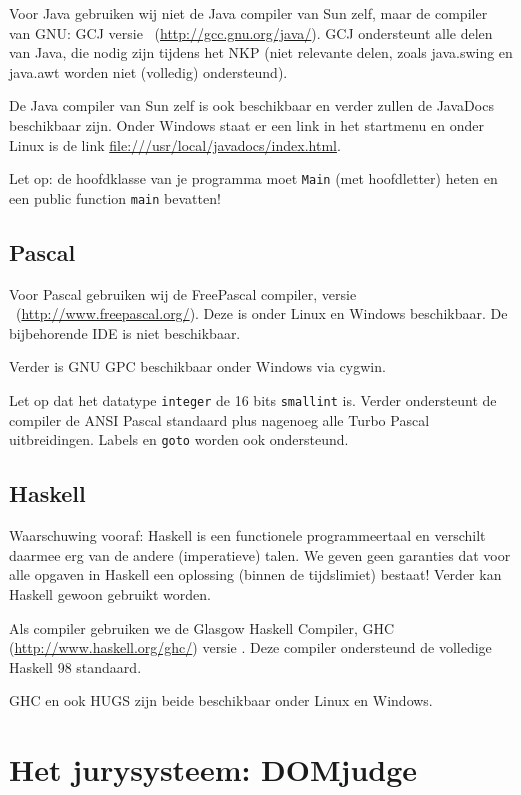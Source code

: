 \documentclass[11pt,titlepage,a4paper]{article}
\newcommand{\DOMjudge}{DOMjudge }
\begin{document}
Voor Java gebruiken wij niet de Java compiler van Sun zelf, maar de
compiler van GNU: GCJ versie \LINUXGCJ\
(\url{http://gcc.gnu.org/java/}). GCJ ondersteunt
alle delen van Java, die nodig zijn tijdens het NKP (niet relevante
delen, zoals java.swing en java.awt worden niet (volledig)
ondersteund).

De Java compiler van Sun zelf is ook beschikbaar en verder zullen de
JavaDocs beschikbaar zijn. Onder Windows staat er een link in het
startmenu en onder Linux is de link
\url{file:///usr/local/javadocs/index.html}.

Let op: de hoofdklasse van je programma moet \texttt{Main} (met
hoofdletter) heten en een public function \texttt{main} bevatten!

\subsection{Pascal}

Voor Pascal gebruiken wij de FreePascal compiler, versie
\LINUXFPC\ (\url{http://www.freepascal.org/}). Deze is onder
Linux en Windows beschikbaar. De bijbehorende IDE is niet
beschikbaar.

Verder is GNU GPC beschikbaar onder Windows via cygwin.

Let op dat het datatype \texttt{integer} de 16 bits \texttt{smallint}
is. Verder ondersteunt de compiler de ANSI Pascal standaard plus
nagenoeg alle Turbo Pascal uitbreidingen. Labels en \texttt{goto}
worden ook ondersteund.

\subsection{Haskell}

Waarschuwing vooraf: Haskell is een functionele programmeertaal en
verschilt daarmee erg van de andere (imperatieve) talen. We geven geen
garanties dat voor alle opgaven in Haskell een oplossing (binnen de
tijdslimiet) bestaat! Verder kan Haskell gewoon gebruikt worden.

Als compiler gebruiken we de Glasgow Haskell Compiler, GHC
(\url{http://www.haskell.org/ghc/}) versie \LINUXGHC. Deze compiler
ondersteund de volledige Haskell 98 standaard.

GHC en ook HUGS zijn beide beschikbaar onder Linux en Windows.


\newpage
\section{Het jurysysteem: \DOMjudge}
\end{document}
